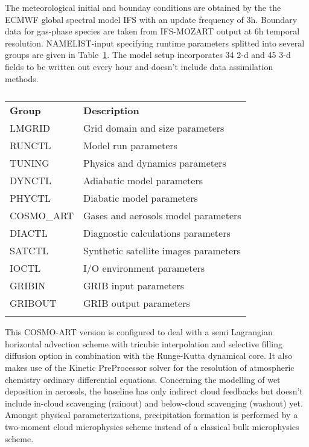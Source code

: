 The meteorological initial and  bounday conditions are obtained by the
the ECMWF  global spectral model IFS  with an update  frequency of 3h.
Boundary data  for gas-phase species are taken  from IFS-MOZART output
at   6h  temporal   resolution.   NAMELIST-input   specifying  runtime
parameters    splitted   into    several   groups    are    given   in
Table~\ref{tab:1}.  The model  setup incorporates  34 2-d  and  45 3-d
fields  to  be  written  out  every  hour  and  doesn't  include  data
assimilation methods.

\begin{table}[htbf]
  \begin{center}
    \caption{}
    \label{tab:1}
    \begin{tabular}{ll}
      \hline\noalign{\smallskip} 
      \textbf{Group} & \textbf{Description} \\
      \noalign{\smallskip}\hline\noalign{\smallskip}
      LMGRID & Grid domain and size parameters \\
      RUNCTL & Model run parameters \\
      TUNING & Physics and dynamics parameters \\
      DYNCTL & Adiabatic model parameters \\
      PHYCTL & Diabatic model parameters \\
      COSMO\_ART & Gases and aerosols model parameters \\
      DIACTL & Diagnostic calculations parameters \\
      SATCTL & Synthetic satellite images parameters \\
      IOCTL & I/O environment parameters \\
      GRIBIN & GRIB input parameters \\
      GRIBOUT & GRIB output parameters \\
     \noalign{\smallskip}\hline
    \end{tabular}
  \end{center}
\end{table}

This COSMO-ART  version is configured  to deal with a  semi Lagrangian
horizontal advection scheme  with tricubic interpolation and selective
filling diffusion option in combination with the Runge-Kutta dynamical
core. It  also makes  use of the  Kinetic PreProcessor solver  for the
resolution of  atmospheric chemistry ordinary  differential equations.
Concerning the  modelling of wet deposition in  aerosols, the baseline
has  only  indirect  cloud  feedbacks  but  doesn't  include  in-cloud
scavenging  (rainout)   and  below-cloud  scavenging   (washout)  yet.
Amongst   physical  parameterizations,   precipitation   formation  is
performed  by a  two-moment  cloud microphysics  scheme  instead of  a
classical  bulk microphysics  scheme.
